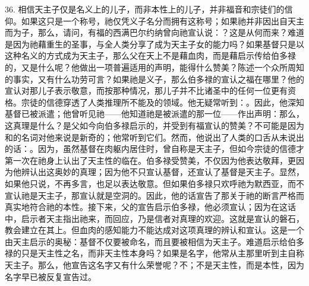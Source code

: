 36. 相信天主子仅是名义上的儿子，而非本性上的儿子，并非福音和宗徒们的信仰。如果这只是一个称号，祂仅凭义子名分而拥有这称号；如果祂并非因出自天主而为子，那么，请问，有福的西满巴尔约纳曾向祂宣认说：？这是从何而来？难道是因为祂藉重生的圣事，与全人类分享了成为天主子女的能力吗？如果基督只是以这种名义的方式成为天主子，那么父在天上不是藉血肉，而是藉启示传给伯多禄的，又是什么呢？他做出一项普遍适用的声明，能得什么赞美？陈述一个众所周知的事实，又有什么功劳可言？如果祂是义子，那么伯多禄的宣认之福在哪里？他的宣认对那儿子表示敬意，而按那种情况，那儿子并不比诸圣中的任何一位更有资格。宗徒的信德穿透了人类推理所不能及的领域。他无疑常听到：。因此，他深知基督已被派遣；他曾听见祂——他知道祂是被派遣的那一位——作出声明：那么，这真理是什么？是父如今向伯多禄启示的，并受到有福宣认的赞美？不可能是因为和的名词对他来说是新奇的；他常听到它们。然而，他说出了人类的口舌从未说出的话：。因为，虽然基督在肉躯内居住时，曾自称是天主子，但如今宗徒的信德才第一次在祂身上认出了天主性的临在。伯多禄受赞美，不仅因为他表达敬拜，更因为他辨认出这奥妙的真理；因为他不只宣认基督，还宣认了基督是天主子。显然，如果他只说，不再多言，也足以表达敬意。但如果伯多禄只欢呼祂为默西亚，而不宣认祂是天主子，那宣认就是空洞的。因此，他的话宣告了那关于祂的断言严格而真实地符合祂的本性。接下来，父的宣告启示伯多禄，他必须宣认；因为在这话中，启示者天主指出祂来，而回应，乃是信者对真理的欢迎。这就是宣认的磐石，教会建立在其上。但血肉的感知能力不能达成对这项真理的辨认和宣认。这是一个由天主启示的奥秘：基督不仅要被命名，而且要被相信为天主子。难道启示给伯多禄的只是天主性之名，而非天主性本身吗？如果是名字，他常从主那里听到主自称天主子。那么，他宣告这名字又有什么荣誉呢？不；不是天主性，而是本性，因为名字早已被反复宣告过。\par

